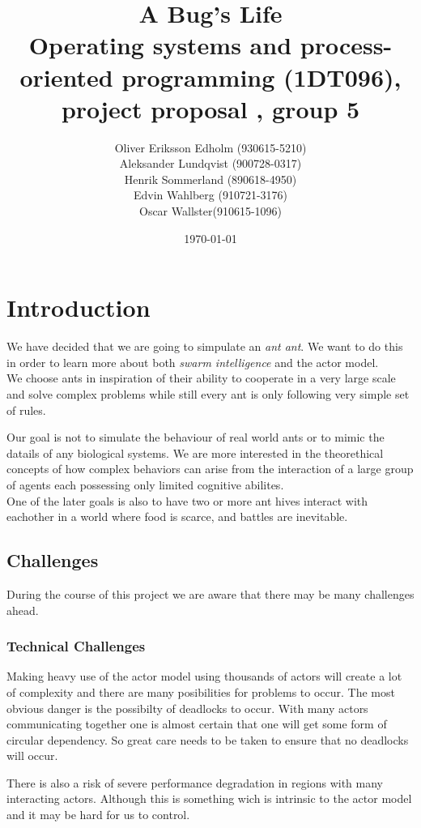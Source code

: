 \documentclass[a4paper]{article}
\title{A Bug's Life\\
 Operating systems and process-oriented programming (1DT096), project proposal
, group 5}
\date{\today}
\author{Oliver Eriksson Edholm (930615-5210) \\
Aleksander Lundqvist (900728-0317) \\
Henrik Sommerland (890618-4950) \\
Edvin Wahlberg (910721-3176) \\
Oscar Wallster(910615-1096)}
\begin{document}
\maketitle

\section{Introduction}
We have decided that we are going to simpulate an \emph{ant ant}. We want to do
this in order to learn more about both \emph{swarm intelligence} and the actor
model.\\
We choose ants in inspiration of their ability to cooperate in a very large
scale and solve complex problems while still every ant is only following very
simple set of rules.

Our goal is not to simulate the behaviour of real world ants or to mimic the
datails of any biological systems.
We are more interested in the theorethical concepts of how complex behaviors can
arise from the interaction of a large group of agents each possessing only limited
cognitive abilites.\\

One of the later goals is also to have two or more ant hives interact with
eachother in a world where food is scarce, and battles are inevitable.

\subsection{Challenges}
During the course of this project we are aware that there may be many challenges
ahead.

\subsubsection{Technical Challenges}
Making heavy use of the actor model using thousands of actors will create a lot
of complexity and there are many posibilities for problems to occur. The most
obvious danger is the possibilty of deadlocks to occur. With many actors
communicating together one is almost certain that one will get some form of
circular dependency. So great care needs to be taken to ensure that no
deadlocks will occur.

There is also a risk of severe performance degradation in regions with many
interacting actors. Although this is something wich is intrinsic to the actor
model and it may be hard for us to control.
\end{document}

